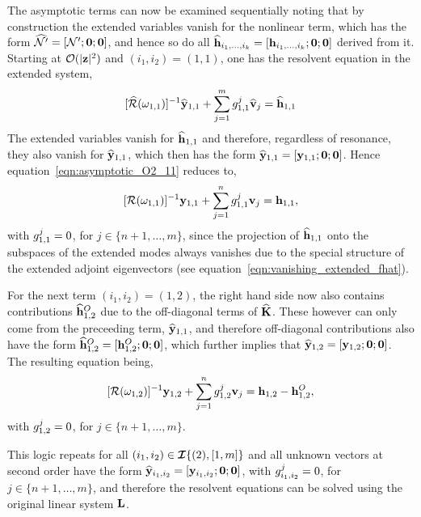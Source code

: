 The asymptotic terms can now be examined sequentially noting that by construction the extended variables vanish for the nonlinear term, which has the form $\widehat{\mathcal{N}'} = [\mathcal{N}'; \mathbf{0}; \mathbf{0}]$, and hence so do all $\widehat{\mathbf{h}}_{i_{1},\ldots,i_{k}} = [\mathbf{h}_{i_{1},\ldots,i_{k}};\mathbf{0};\mathbf{0}]$ derived from it. Starting at $\mathcal{O}(|\mathbf{z}|^{2})$ and $(i_{1},i_{2})=(1,1)$, one has the resolvent equation in the extended system,
\begin{align}
	\label{eqn:asymptotic_O2_11}
		[\widehat{\mathcal{R}}(\omega_{1,1})]^{-1}\widehat{\mathbf{y}}_{1,1} + \sum^{m}_{j=1}g^{j}_{1,1}\widehat{\mathbf{v}}_{j} 
		= \widehat{\mathbf{h}}_{1,1}
\end{align}
The extended variables vanish for $\widehat{\mathbf{h}}_{1,1}$ and therefore, regardless of resonance, they also vanish for $\widehat{\mathbf{y}}_{1,1}$, which then has the form $ \widehat{\mathbf{y}}_{1,1} = [\mathbf{y}_{1,1};\mathbf{0};\mathbf{0}]$. Hence equation~\eqref{eqn:asymptotic_O2_11} reduces to,
\begin{align}
	\label{eqn:asymptotic_O2_11r}
	[\mathcal{R}(\omega_{1,1})]^{-1}\mathbf{y}_{1,1} + \sum^{n}_{j=1}g^{j}_{1,1}\mathbf{v}_{j} 
	= \mathbf{h}_{1,1},
\end{align}
with $g^{j}_{1,1} = 0$, for $j\in \{n+1,\ldots,m\}$, since the projection of $\widehat{\mathbf{h}}_{1,1}$ onto the subspaces of the extended modes always vanishes due to the special structure of the extended adjoint eigenvectors (see equation~\ref{eqn:vanishing_extended_fhat}). 

For the next term $(i_{1},i_{2})=(1,2)$, the right hand side now also contains contributions $\mathbf{\widehat{h}}^{O}_{1,2}$ due to the off-diagonal terms of $\mathbf{\widehat{K}}$. These however can only come from the preceeding term, $\widehat{\mathbf{y}}_{1,1}$, and therefore off-diagonal contributions also have the form $\widehat{\mathbf{h}}^{O}_{1,2} = [\mathbf{h}^{O}_{1,2};\mathbf{0};\mathbf{0}]$, which further implies that $\widehat{\mathbf{y}}_{1,2} = [\mathbf{y}_{1,2};\mathbf{0};\mathbf{0}]$. The resulting equation being, 
\begin{align}
	\label{eqn:asymptotic_O2_12r}
	[\mathcal{R}(\omega_{1,2})]^{-1}\mathbf{y}_{1,2} + \sum^{n}_{j=1}g^{j}_{1,2}\mathbf{v}_{j} 
	= \mathbf{h}_{1,2} - \mathbf{h}^{O}_{1,2},
\end{align}
with $g^{j}_{1,2} = 0$, for $j\in \{n+1,\ldots,m\}$.

This logic repeats for all $(i_{1},i_{2})\in\bm{\mathcal{I}}\{(2),[1,m]\}$ and all unknown vectors at second order have the form $\widehat{\mathbf{y}}_{i_{1},i_{2}} = [\mathbf{y}_{i_{1},i_{2}}; \mathbf{0}; \mathbf{0}]$, with $g^{j}_{i_{1},i_{2}} = 0$, for $j\in \{n+1,\ldots,m\}$, and therefore the resolvent equations can be solved using the original linear system $\mathbf{L}$. 

